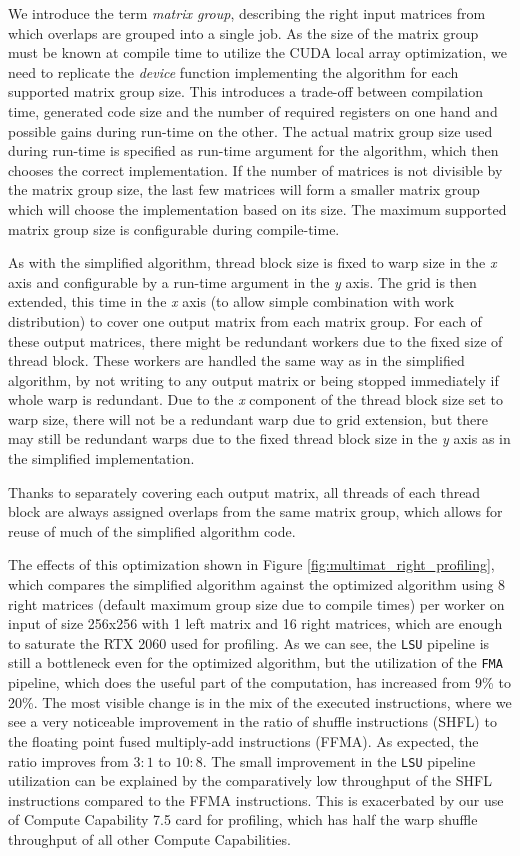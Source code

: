 We introduce the term \textit{matrix group}, describing the right input matrices from which overlaps are grouped into a single job. As the size of the matrix group must be known at compile time to utilize the CUDA local array optimization, we need to replicate the \textit{device} function implementing the algorithm for each supported matrix group size. This introduces a trade-off between compilation time, generated code size and the number of required registers on one hand and possible gains during run-time on the other. The actual matrix group size used during run-time is specified as run-time argument for the algorithm, which then chooses the correct implementation. If the number of matrices is not divisible by the matrix group size, the last few matrices will form a smaller matrix group which will choose the implementation based on its size. The maximum supported matrix group size is configurable during compile-time.


As with the simplified algorithm, thread block size is fixed to warp size in the \textit{x} axis and configurable by a run-time argument in the \textit{y} axis. The grid is then extended, this time in the \textit{x} axis (to allow simple combination with work distribution) to cover one output matrix from each matrix group. For each of these output matrices, there might be redundant workers due to the fixed size of thread block. These workers are handled the same way as in the simplified algorithm, by not writing to any output matrix or being stopped immediately if whole warp is redundant.
Due to the \textit{x} component of the thread block size set to warp size, there will not be a redundant warp due to grid extension, but there may still be redundant warps due to the fixed thread block size in the \textit{y} axis as in the simplified implementation.
 
Thanks to separately covering each output matrix, all threads of each thread block are always assigned overlaps from the same matrix group, which allows for reuse of much of the simplified algorithm code.

The effects of this optimization shown in Figure \ref{fig:multimat_right_profiling}, which compares the simplified algorithm against the optimized algorithm using 8 right matrices (default maximum group size due to compile times) per worker on input of size 256x256 with 1 left matrix and 16 right matrices, which are enough to saturate the RTX 2060 used for profiling. As we can see, the \texttt{LSU} pipeline is still a bottleneck even for the optimized algorithm, but the utilization of the \texttt{FMA} pipeline, which does the useful part of the computation, has increased from 9\% to 20\%. The most visible change is in the mix of the executed instructions, where we see a very noticeable improvement in the ratio of shuffle instructions (SHFL) to the floating point fused multiply-add instructions (FFMA). As expected, the ratio improves from $3 : 1$ to $10 : 8$. The small improvement in the \texttt{LSU} pipeline utilization can be explained by the comparatively low throughput of the SHFL instructions compared to the FFMA instructions. This is exacerbated by our use of Compute Capability 7.5 card for profiling, which has half the warp shuffle throughput of all other Compute Capabilities.

